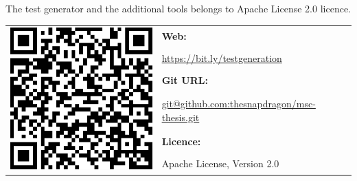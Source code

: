 \appendix
\chapter*{\fuggelek}
\label{cha:appendix}

\setcounter{chapter}{6}  %
\setcounter{equation}{0} %

The test generator and the additional tools belongs to Apache License 2.0 licence.

\begin{table}[htb]
\begin{center}
\begin{tabular}{cl}
\multirow{6}{*}{\includegraphics[scale=0.3]{figures/qrcode.png}}
& \textbf{Web:} \\
& \url{https://bit.ly/testgeneration} \\
& \textbf{Git URL:} \\
& \url{git@github.com:thesnapdragon/msc-thesis.git} \\
& \textbf{Licence:} \\
& Apache License, Version 2.0 \\
\end{tabular}
\end{center}
\end{table}

